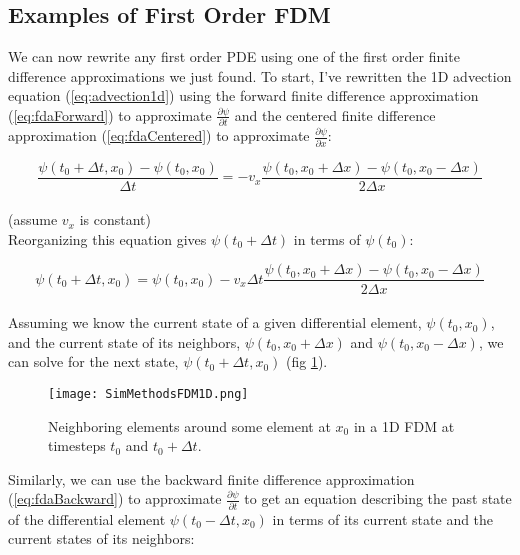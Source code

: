 {\subsection{Examples of First Order FDM}

We can now rewrite any first order PDE using one of the first order finite difference approximations we just found.  To start, I've rewritten the 1D advection equation (\ref{eq:advection1d}) using the forward finite difference approximation (\ref{eq:fdaForward}) to approximate $\frac{\partial \psi}{\partial t}$ and the centered finite difference approximation (\ref{eq:fdaCentered}) to approximate $\frac{\partial \psi}{\partial x}$:

 \begin{equation}
  \frac{ \psi(t_{0} + \Delta  t,  x_{0}) - \psi(t_{0}, x_{0})}{\Delta t} = -v_{x}\frac{\psi(t_{0}, x_{0} + \Delta  x)-\psi(t_{0}, x_{0}-\Delta x)}{2\Delta  x}
  \end{equation}
  \\
  (assume $v_{x}$ is constant)\\
  
  Reorganizing this equation gives $\psi(t_{0}+\Delta t)$ in terms of $\psi(t_{0})$:
  
   \begin{equation}\label{eq:advection1Dapprox}
  \psi(t_{0} + \Delta  t,  x_{0}) = \psi(t_{0}, x_{0})-v_{x}\Delta t \frac{\psi(t_{0}, x_{0} + \Delta  x)-\psi(t_{0}, x_{0}-\Delta x)}{2\Delta  x}
  \end{equation}
\\
Assuming we know the current state of a given differential element, $\psi(t_{0}, x_{0})$, and the current state of its neighbors, $\psi(t_{0}, x_{0}+\Delta x)$ and $\psi(t_{0}, x_{0}-\Delta x)$, we can solve for the next state, $\psi(t_{0}+\Delta t, x_{0})$ (fig \ref{fig:SimMethodsFDM1D}).\\

\begin{figure}
  \texttt{[image: SimMethodsFDM1D.png]}
  \caption{Neighboring elements around some element at $x_{0}$ in a 1D FDM at timesteps $t_{0}$ and $t_{0}+\Delta t$.}
  \label{fig:SimMethodsFDM1D}
\end{figure}

Similarly, we can use the backward finite difference approximation (\ref{eq:fdaBackward}) to approximate $\frac{\partial \psi}{\partial t}$ to get an equation describing the past state of the differential element $\psi(t_{0}-\Delta t, x_{0})$ in terms of its current state and the current states of its neighbors:

}
